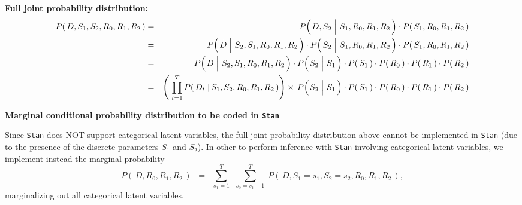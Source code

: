 \vskip 0.5cm
\noindent
\textbf{Full joint probability distribution:}
\begin{eqnarray*}
P\!\left(\,D,S_{1},S_{2},R_{0},R_{1},R_{2}\,\right)
& = &
	P\!\left(\left.\overset{{\color{white}.}}{D},S_{2} \;\right\vert\, S_{1},R_{0},R_{1},R_{2}\,\right)
	\cdot
	P\!\left(\,S_{1},R_{0},R_{1},R_{2}\,\right)
\\
& = &
	P\!\left(\left.\overset{{\color{white}.}}{D} \;\right\vert\, S_{2},S_{1},R_{0},R_{1},R_{2}\,\right)
	\cdot
	P\!\left(\left.\overset{{\color{white}.}}{S_{2}} \;\right\vert\, S_{1},R_{0},R_{1},R_{2}\,\right)
	\cdot
	P\!\left(\,S_{1},R_{0},R_{1},R_{2}\,\right)
\\
& = &
	P\!\left(\left.\overset{{\color{white}.}}{D} \;\right\vert\, S_{2},S_{1},R_{0},R_{1},R_{2}\,\right)
	\cdot
	P\!\left(\left.\overset{{\color{white}.}}{S_{2}} \;\right\vert\, S_{1}\,\right)
	\cdot
	P\!\left(\,S_{1}\,\right)
	\cdot
	P\!\left(\,R_{0}\,\right)
	\cdot
	P\!\left(\,R_{1}\,\right)
	\cdot
	P\!\left(\,R_{2}\,\right)
\\
& = &
	\left(\;
		\overset{T}{\underset{t=1}{\prod}}\,
		P\!\left(\,D_{t} \;\vert\, S_{1},S_{2},R_{0},R_{1},R_{2}\,\right)
		\right)
	\times\,
	P\!\left(\left.\overset{{\color{white}.}}{S_{2}} \;\right\vert\, S_{1}\,\right)
	\cdot
	P\!\left(\,S_{1}\,\right)
	\cdot
	P\!\left(\,R_{0}\,\right)
	\cdot
	P\!\left(\,R_{1}\,\right)
	\cdot
	P\!\left(\,R_{2}\,\right)
\end{eqnarray*}


\vskip 1.0cm
\noindent
\begin{center}
\textbf{\large Marginal conditional probability distribution to be coded in \texttt{Stan}}
\end{center}
\vskip 0.3cm
\noindent
Since \texttt{Stan} does NOT support categorical latent variables,
the full joint probability distribution above cannot be implemented in \texttt{Stan}
(due to the presence of the discrete parameters $S_{1}$ and $S_{2}$).
In other to perform inference with \texttt{Stan} involving categorical latent variables,
we implement instead the {\color{red}marginal probability}
\begin{equation*}
P\!\left(\,D,R_{0},R_{1},R_{2}\,\right)
\;\; = \;\;
	\overset{T}{\underset{s_{1}=1}{\sum}}\;\,
	\overset{T}{\underset{s_{2}=s_{1}+1}{\sum}}\;
	P\!\left(\,D,S_{1}=s_{1},S_{2}=s_{2},R_{0},R_{1},R_{2}\,\right),
\end{equation*}
marginalizing out all categorical latent variables.

